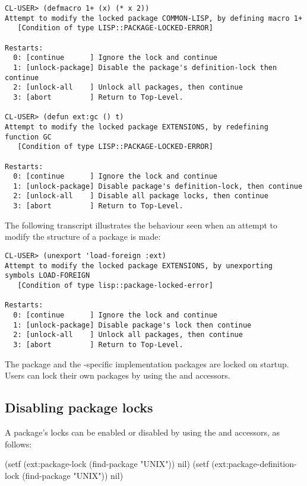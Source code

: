{\small
\begin{verbatim}
CL-USER> (defmacro 1+ (x) (* x 2))
Attempt to modify the locked package COMMON-LISP, by defining macro 1+
   [Condition of type LISP::PACKAGE-LOCKED-ERROR]

Restarts:
  0: [continue      ] Ignore the lock and continue
  1: [unlock-package] Disable the package's definition-lock then continue
  2: [unlock-all    ] Unlock all packages, then continue
  3: [abort         ] Return to Top-Level.

CL-USER> (defun ext:gc () t)
Attempt to modify the locked package EXTENSIONS, by redefining function GC
   [Condition of type LISP::PACKAGE-LOCKED-ERROR]

Restarts:
  0: [continue      ] Ignore the lock and continue
  1: [unlock-package] Disable package's definition-lock, then continue
  2: [unlock-all    ] Disable all package locks, then continue
  3: [abort         ] Return to Top-Level.
\end{verbatim}


The following transcript illustrates the behaviour seen when an
attempt to modify the structure of a package is made:

\begin{verbatim}
CL-USER> (unexport 'load-foreign :ext)
Attempt to modify the locked package EXTENSIONS, by unexporting symbols LOAD-FOREIGN
   [Condition of type lisp::package-locked-error]

Restarts:
  0: [continue      ] Ignore the lock and continue
  1: [unlock-package] Disable package's lock then continue
  2: [unlock-all    ] Unlock all packages, then continue
  3: [abort         ] Return to Top-Level.
\end{verbatim}
}

The  package and the \cmucl{}-specific
implementation packages are locked on startup. Users can lock their
own packages by using the  and
 accessors.



\subsection{Disabling package locks}

A package's locks can be enabled or disabled by using the
 and 
accessors, as follows:

\begin{lisp}
   (setf (ext:package-lock (find-package "UNIX")) nil)
   (setf (ext:package-definition-lock (find-package "UNIX")) nil)
\end{lisp}



